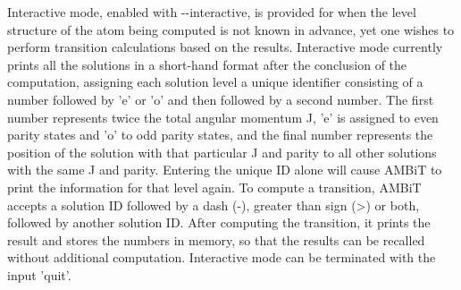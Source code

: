 \documentclass[a4paper,11pt]{article}
\begin{document}
Interactive mode, enabled with -{}-interactive, is provided for when the level structure of the atom being computed is not known in advance, yet one wishes to perform transition calculations based on the results. Interactive mode currently prints all the solutions in a short-hand format after the conclusion of the computation, assigning each solution level a unique identifier consisting of a number followed by 'e' or 'o' and then followed by a second number. The first number represents twice the total angular momentum J, 'e' is assigned to even parity states and 'o' to odd parity states, and the final number represents the position of the solution with that particular J and parity to all other solutions with the same J and parity. Entering the unique ID alone will cause AMBiT to print the information for that level again. To compute a transition, AMBiT accepts a solution ID followed by a dash (-), greater than sign (>) or both, followed by another solution ID. After computing the transition, it prints the result and stores the numbers in memory, so that the results can be recalled without additional computation. Interactive mode can be terminated with the input 'quit'.



\end{document}
